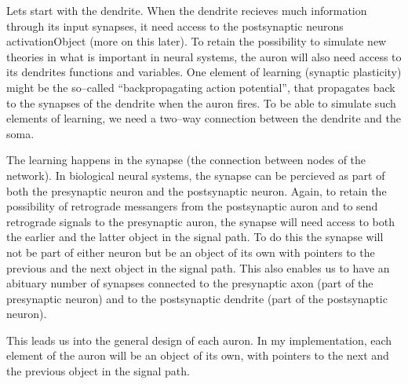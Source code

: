 		Lets start with the dendrite. When the dendrite recieves much information through its input synapses, it need access to the postsynaptic neurons activationObject (more on this later).%
		To retain the possibility to simulate new theories in what is important in neural systems, the auron will also need access to its dendrites functions and variables. 
		One element of learning (synaptic plasticity) might be the so--called ``backpropagating action potential'', that propagates back to the synapses of the dendrite when the auron fires.
		To be able to simulate such elements of learning, we need a two--way connection between the dendrite and the soma.


		The learning happens in the synapse (the connection between nodes of the network). In biological neural systems, the synapse can be percieved as part of both the presynaptic neuron and the postsynaptic neuron.
		Again, to retain the possibility of retrograde messangers from the postsynaptic auron and to send retrograde signals to the presynaptic auron, the synapse will need access to both the earlier and the latter object in the signal path. To do this the synapse will not be part of either neuron but be an object of its own with pointers to the previous and the next object in the signal path. 
		This also enables us to have an abituary number of synapses connected to the presynaptic axon (part of the presynaptic neuron) and to the postsynaptic dendrite (part of the postsynaptic neuron).

		This leads us into the general design of each auron. In my implementation, each element of the auron will be an object of its own, with pointers to the next and the previous object in the signal path.



		
		

